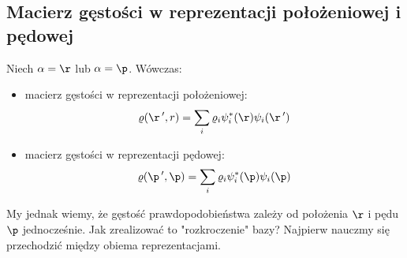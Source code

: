 \subsection{Macierz gęstości w reprezentacji położeniowej i pędowej}
Niech $\alpha=\r$ lub $\alpha=\p$. Wówczas:
\begin{itemize}
\item macierz gęstości w reprezentacji położeniowej:
\begin{equation}\varrho(\r\,',r)=\sum_i\varrho_i\psi_i^*(\r)\psi_i(\r\,')
\end{equation}
\item macierz gęstości w reprezentacji pędowej:
\begin{equation}\varrho(\p\,',\p)=\sum_i\varrho_i\psi_i^*(\p)\psi_i(\p)\end{equation}
\end{itemize}
My jednak wiemy, że gęstość prawdopodobieństwa zależy od położenia $\r$ i pędu $\p$ jednocześnie. Jak zrealizować to "rozkroczenie" bazy? Najpierw nauczmy się przechodzić między obiema reprezentacjami.
